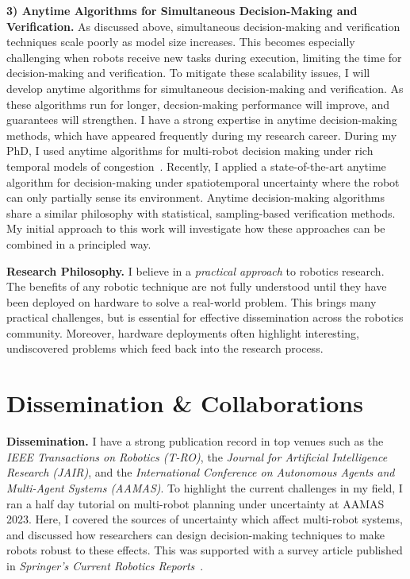 \documentclass[12pt]{article}
\begin{document}
\vspace*{1ex}\noindent\hypertarget{topicthree}{\textbf{3) Anytime Algorithms for Simultaneous Decision-Making and Verification.}} As discussed above, simultaneous decision-making and verification techniques scale poorly as model size increases.
%
This becomes especially challenging when robots receive new tasks during execution, limiting the time for decision-making and verification.
%
To mitigate these scalability issues, I will develop anytime algorithms for simultaneous decision-making and verification.
%
As these algorithms run for longer, decsion-making performance will improve, and guarantees will strengthen.
%
I have a strong expertise in anytime decision-making methods, which have appeared frequently during my research career.
%
During my PhD, I used anytime algorithms for multi-robot decision making under rich temporal models of congestion~\cite{street2020multi,street2021congestion}.
%
Recently, I applied a state-of-the-art anytime algorithm for decision-making under spatiotemporal uncertainty where the robot can only partially sense its environment.
%
Anytime decision-making algorithms share a similar philosophy with statistical, sampling-based verification methods.
%
My initial approach to this work will investigate how these approaches can be combined in a principled way.

\vspace*{1ex}\noindent\textbf{Research Philosophy.} I believe in a \emph{practical approach} to robotics research.
%
The benefits of any robotic technique are not fully understood until they have been deployed on hardware to solve a real-world problem.
%
This brings many practical challenges, but is essential for effective dissemination across the robotics community.
%
Moreover, hardware deployments often highlight interesting, undiscovered problems which feed back into the research process.

\section*{Dissemination \& Collaborations}

\vspace*{1ex}\noindent\textbf{Dissemination.} I have a strong publication record in top venues such as the \emph{IEEE Transactions on Robotics (T-RO)}, the \emph{Journal for Artificial Intelligence Research (JAIR)}, and the \emph{International Conference on Autonomous Agents and Multi-Agent Systems (AAMAS)}.
%
To highlight the current challenges in my field, I ran a half day tutorial on multi-robot planning under uncertainty at AAMAS 2023.
%
Here, I covered the sources of uncertainty which affect multi-robot systems, and discussed how researchers can design decision-making techniques to make robots robust to these effects.
%
This was supported with a survey article published in \emph{Springer's Current Robotics Reports}~\cite{street2023formal}.
\end{document}
